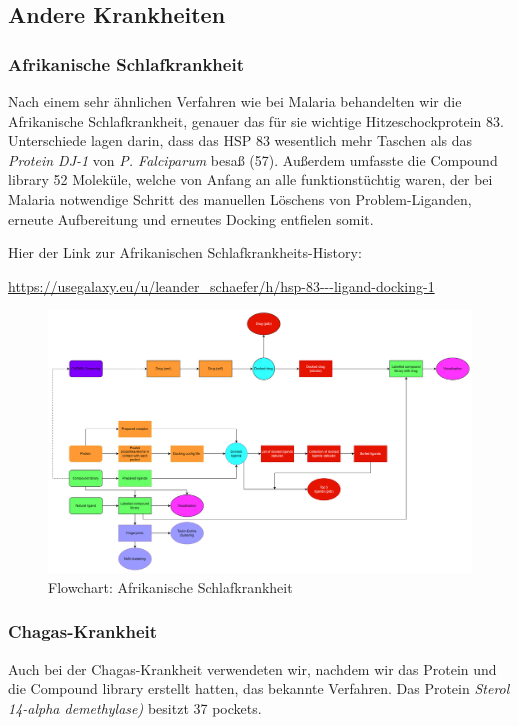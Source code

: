 \documentclass[10pt]{article}
\begin{document}
    \subsection{Andere Krankheiten}\label{subsubsec:andere-krankheiten}

    \subsubsection{Afrikanische Schlafkrankheit}
    Nach einem sehr ähnlichen Verfahren wie bei Malaria behandelten wir die Afrikanische Schlafkrankheit, genauer das
    für sie wichtige Hitzeschockprotein 83. Unterschiede lagen darin, dass das HSP 83 wesentlich mehr Taschen als
    das \emph{Protein DJ-1} von \emph{P. Falciparum} besaß (57). Außerdem umfasste die Compound library 52 Moleküle,
    welche von Anfang an alle
    funktionstüchtig waren, der bei Malaria notwendige Schritt des manuellen Löschens von Problem-Liganden, erneute
    Aufbereitung und erneutes Docking entfielen somit.

    Hier der Link zur Afrikanischen Schlafkrankheits-History:

    \url{https://usegalaxy.eu/u/leander_schaefer/h/hsp-83---ligand-docking-1}


    \begin{figure}[H]
        \centering
        \includegraphics[width=0.7\linewidth]{afrikanische schlafkrankheit-flowchart}
        \caption{Flowchart: Afrikanische Schlafkrankheit}
    \end{figure}

    \subsubsection{Chagas-Krankheit}
    Auch bei der Chagas-Krankheit verwendeten wir, nachdem wir das Protein und die Compound library erstellt hatten,
    das bekannte Verfahren.
    Das Protein \emph{Sterol 14-alpha demethylase)} besitzt 37 pockets.
\end{document}
